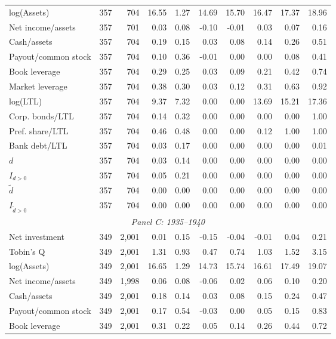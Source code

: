 \begin{threeparttable}
\begin{tabular}{lrrrrrrrrr}
log(Assets) & 357 & 704 & 16.55 & 1.27 & 14.69 & 15.70 & 16.47 & 17.37 & 18.96 \\
Net income/assets & 357 & 701 & 0.03 & 0.08 & -0.10 & -0.01 & 0.03 & 0.07 & 0.16 \\
Cash/assets & 357 & 704 & 0.19 & 0.15 & 0.03 & 0.08 & 0.14 & 0.26 & 0.51 \\
Payout/common stock & 357 & 704 & 0.10 & 0.36 & -0.01 & 0.00 & 0.00 & 0.08 & 0.41 \\
Book leverage & 357 & 704 & 0.29 & 0.25 & 0.03 & 0.09 & 0.21 & 0.42 & 0.74 \\
Market leverage & 357 & 704 & 0.38 & 0.30 & 0.03 & 0.12 & 0.31 & 0.63 & 0.92 \\
log(LTL) & 357 & 704 & 9.37 & 7.32 & 0.00 & 0.00 & 13.69 & 15.21 & 17.36 \\
Corp. bonds/LTL & 357 & 704 & 0.14 & 0.32 & 0.00 & 0.00 & 0.00 & 0.00 & 1.00 \\
Pref. share/LTL & 357 & 704 & 0.46 & 0.48 & 0.00 & 0.00 & 0.12 & 1.00 & 1.00 \\
Bank debt/LTL & 357 & 704 & 0.03 & 0.17 & 0.00 & 0.00 & 0.00 & 0.00 & 0.01 \\
\ensuremath{d} & 357 & 704 & 0.03 & 0.14 & 0.00 & 0.00 & 0.00 & 0.00 & 0.00 \\
\ensuremath{I_{d>0}} & 357 & 704 & 0.05 & 0.21 & 0.00 & 0.00 & 0.00 & 0.00 & 0.00 \\
\ensuremath{\tilde{d}} & 357 & 704 & 0.00 & 0.00 & 0.00 & 0.00 & 0.00 & 0.00 & 0.00 \\
\ensuremath{I_{\tilde{d}>0}} & 357 & 704 & 0.00 & 0.00 & 0.00 & 0.00 & 0.00 & 0.00 & 0.00 \\
\midrule
\multicolumn{10}{c}{\textit{Panel C: 1935--1940}} \\
\midrule
Net investment & 349 & 2,001 & 0.01 & 0.15 & -0.15 & -0.04 & -0.01 & 0.04 & 0.21 \\
Tobin's Q & 349 & 2,001 & 1.31 & 0.93 & 0.47 & 0.74 & 1.03 & 1.52 & 3.15 \\
log(Assets) & 349 & 2,001 & 16.65 & 1.29 & 14.73 & 15.74 & 16.61 & 17.49 & 19.07 \\
Net income/assets & 349 & 1,998 & 0.06 & 0.08 & -0.06 & 0.02 & 0.06 & 0.10 & 0.20 \\
Cash/assets & 349 & 2,001 & 0.18 & 0.14 & 0.03 & 0.08 & 0.15 & 0.24 & 0.47 \\
Payout/common stock & 349 & 2,001 & 0.17 & 0.54 & -0.03 & 0.00 & 0.05 & 0.15 & 0.83 \\
Book leverage & 349 & 2,001 & 0.31 & 0.22 & 0.05 & 0.14 & 0.26 & 0.44 & 0.72 \\

\end{tabular}
\end{threeparttable}
